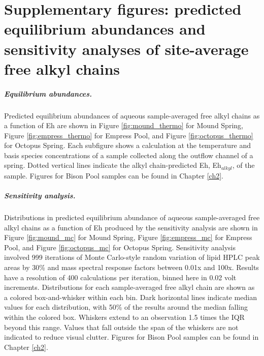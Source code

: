 \chapter{Supplementary figures: predicted equilibrium abundances and sensitivity analyses of site-average free alkyl chains}\label{app2}

\doublespace

\paragraph*{Equilibrium abundances.} Predicted equilibrium abundances of aqueous sample-averaged free alkyl chains as a function of Eh are shown in Figure \ref{fig:mound_thermo} for Mound Spring, Figure \ref{fig:empress_thermo} for Empress Pool, and Figure \ref{fig:octopus_thermo} for Octopus Spring. Each subfigure shows a calculation at the temperature and basis species concentrations of a sample collected along the outflow channel of a spring. Dotted vertical lines indicate the alkyl chain-predicted Eh, Eh$_{alkyl}$, of the sample. Figures for Bison Pool samples can be found in Chapter \ref{ch2}.

\paragraph*{Sensitivity analysis.}
Distributions in predicted equilibrium abundance of aqueous sample-averaged free alkyl chains as a function of Eh produced by the sensitivity analysis are shown in Figure \ref{fig:mound_mc} for Mound Spring, Figure \ref{fig:empress_mc} for Empress Pool, and Figure \ref{fig:octopus_mc} for Octopus Spring. Sensitivity analysis involved 999 iterations of Monte Carlo-style random variation of lipid HPLC peak areas by 30\% and mass spectral response factors between 0.01x and 100x. Results have a resolution of 400 calculations per iteration, binned here in 0.02 volt increments. Distributions for each sample-averaged free alkyl chain are shown as a colored box-and-whisker within each bin. Dark horizontal lines indicate median values for each distribution, with 50\% of the results around the median falling within the colored box. Whiskers extend to an observation 1.5 times the IQR beyond this range. Values that fall outside the span of the whiskers are not indicated to reduce visual clutter. Figures for Bison Pool samples can be found in Chapter \ref{ch2}.

